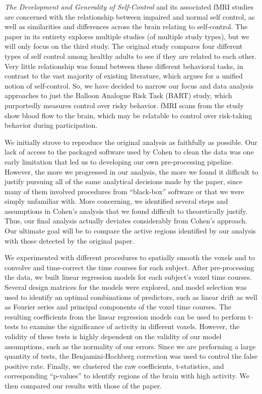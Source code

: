 \par \textit{The Development and Generality of Self-Control} \cite
{CohenSelfControl} and its associated fMRI studies are concerned with the 
relationship between impaired and normal self control, as well as 
similarities and differences across the brain relating to self-control. The 
paper in its entirety explores multiple studies (of multiple study types), 
but we will only focus on the third study. The original study compares four 
different types of self control among healthy adults to see if they are 
related to each other. Very little relationship was found between these 
different behavioral tasks, in contrast to the vast majority of existing 
literature,  which argues for a unified notion of self-control. So, we have 
decided to narrow our focus and data analysis approaches to just the Balloon 
Analogue Risk Task (BART) study, which purportedly measures control over 
risky behavior. fMRI scans from the study show blood flow to the brain, which 
may be relatable to control over risk-taking behavior during participation.

\par We initially strove to reproduce the original analysis as faithfully as 
possible. Our lack of access to the packaged software used by Cohen to clean 
the data was one early limitation that led us to developing our own 
pre-processing pipeline. However, the more we progressed in our analysis, 
the more we found it difficult to justify pursuing all of the same analytical 
decisions made by the paper, since many of them involved procedures from 
``black-box'' software or that we were simply unfamiliar with. More 
concerning, we identified several steps and assumptions in Cohen's analysis 
that we found difficult to theoretically justify. Thus, our final analysis 
actually deviates considerably from Cohen's approach. Our ultimate goal will 
be to compare the active regions identified by our analysis with those 
detected by the original paper. 

\par We experimented with different procedures to spatially smooth the voxels 
and to convolve and time-correct the time courses for each subject. After 
pre-processing the data, we built linear regression models for each subject's 
voxel time courses. Several design matrices for the models were explored, and 
model selection was used to identify an optimal combinations of predictors, 
such as linear drift as well as Fourier series and principal components of the 
voxel time courses. The resulting coefficients from the linear regression 
models can be used to perform t-tests to examine the significance of activity 
in different voxels. However, the validity of these tests is highly dependent 
on the validity of our model assumptions, such as the normality of our errors. 
Since we are performing a large quantity of tests, the Benjamini-Hochberg 
correction was used to control the false positive rate. Finally, we clustered 
the raw coefficients, t-statistics, and corresponding ``p-values'' to identify 
regions of the brain with high activity. We then compared our results with 
those of the paper. 

